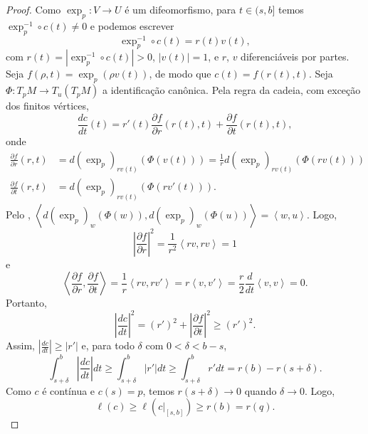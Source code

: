 \begin{lemma}
\begin{proof}
        Como $\exp_{p}:V\to U$ é um difeomorfismo, para $t\in(s,b]$ temos $\exp_{p}^{-1}\circ c(t)\neq 0$ e podemos escrever
        \begin{equation*}
            \exp_{p}^{-1}\circ c(t)=r(t)v(t),
        \end{equation*}
        com $r(t)=|\exp_{p}^{-1}\circ c(t)|>0$, $|v(t)|=1$, e $r$, $v$ diferenciáveis por partes. Seja $f(\rho,t)=\exp_{p}(\rho v(t))$, de modo que $c(t)=f(r(t),t)$. Seja $\Phi:T_{p}M\to T_{u}(T_{p}M)$ a identificação canônica. Pela regra da cadeia, com exceção dos finitos vértices,
        \begin{equation*}
            \frac{dc}{dt}(t)=r'(t)\frac{\partial f}{\partial r}(r(t),t)+\frac{\partial f}{\partial t}(r(t),t),
        \end{equation*}
        onde
        \begin{align*}
            \frac{\partial f}{\partial r}(r,t) & =d(\exp_{p})_{rv(t)}(\Phi(v(t)))=\frac{1}{r}d(\exp_{p})_{rv(t)}(\Phi(rv(t))) \\
            \frac{\partial f}{\partial t}(r,t) & =d(\exp_{p})_{rv(t)}(\Phi(rv'(t))).
        \end{align*}
        Pelo , $\left< d(\exp_{p})_{w}(\Phi(w)),d(\exp_{p})_{w}(\Phi(u)) \right>=\left< w,u \right>$. Logo,
        \begin{equation*}
            \left\lvert \frac{\partial f}{\partial r} \right\rvert^{2}=\frac{1}{r^{2}}\left< rv,rv \right>=1
        \end{equation*}
        e
        \begin{equation*}
            \left< \frac{\partial f}{\partial r},\frac{\partial f}{\partial t} \right>=\frac{1}{r}\left< rv,rv' \right>=r\left< v,v' \right>=\frac{r}{2}\frac{d}{dt}\left< v,v \right>=0.
        \end{equation*}
        Portanto,
        \begin{equation}
            \label{eq:desigualdade-radial-1}
            \left\lvert \frac{dc}{dt} \right\rvert^{2}=(r')^{2}+\left\lvert \frac{\partial f}{\partial t} \right\rvert^{2}\geq (r')^{2}.
        \end{equation}
        Assim, $\left\lvert \frac{dc}{dt} \right\rvert\geq |r'|$ e, para todo $\delta$ com $0<\delta<b-s$,
        \begin{equation*}
            \int_{s+\delta}^{b}\left\lvert \frac{dc}{dt} \right\rvert dt\geq\int_{s+\delta}^{b}|r'|dt\geq\int_{s+\delta}^{b}r'dt=r(b)-r(s+\delta).
        \end{equation*}
        Como $c$ é contínua e $c(s)=p$, temos $r(s+\delta)\to 0$ quando $\delta\to0$. Logo,
        \begin{equation*}
            \ell(c)\geq \ell(c|_{[s,b]})\geq r(b)=r(q).
        \end{equation*}


\end{proof}
\end{lemma}
